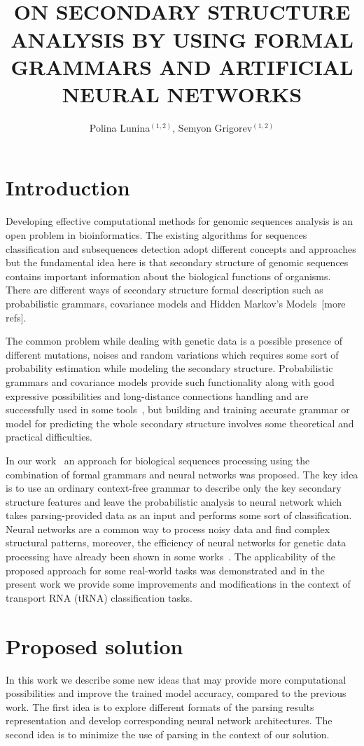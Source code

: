 \documentclass[12pt,a4paper]{cibb}
\title{\large $\ $\\ \bf ON SECONDARY STRUCTURE ANALYSIS BY USING FORMAL GRAMMARS AND ARTIFICIAL NEURAL NETWORKS}
\author{ Polina Lunina$^{(1,2)}$, Semyon Grigorev$^{(1,2)}$}
\begin{document}
\thispagestyle{myheadings}
\pagestyle{myheadings}



\section{\bf Introduction}
 Developing effective computational methods for genomic sequences analysis is an open problem in bioinformatics. The existing algorithms for sequences classification and subsequences detection adopt different concepts and approaches but the fundamental idea here is that secondary structure of genomic sequences contains important information about the biological functions of organisms. There are different ways of secondary structure formal description such as probabilistic grammars, covariance models and Hidden Markov’s Models~\cite{EddyDurbin}[more refs]. 

The common problem while dealing with genetic data is a possible presence of different mutations, noises and random variations which requires some sort of probability estimation while modeling the secondary structure. Probabilistic grammars and covariance models provide such functionality along with good expressive possibilities and long-distance connections handling and are successfully used in some tools~\cite{Infernal}, but building and training accurate grammar or model for predicting the whole secondary structure involves some theoretical and practical difficulties.

In our work~\cite{grigorevcomposition} an approach for biological sequences processing using the combination of formal grammars and neural networks was proposed. The key idea is to use an ordinary context-free grammar to describe only the key secondary structure features and leave the probabilistic analysis to neural network which takes parsing-provided data as an input and performs some sort of classification. Neural networks are a common way to process noisy data and find complex structural patterns, moreover, the efficiency  of neural networks for genetic data processing have already been shown in some works~\cite{Humidor,ANN}. The applicability of the proposed approach for some real-world tasks was demonstrated and in the present work we provide some improvements and modifications in the context of transport RNA (tRNA) classification tasks. 


\section{\bf Proposed solution}
In this work we describe some new ideas that may provide more computational possibilities and improve the trained model accuracy, compared to the previous work. The first idea is to explore different formats of the parsing results representation and develop corresponding neural network architectures. The second idea is to minimize the use of parsing in the context of our solution.
\end{document}
